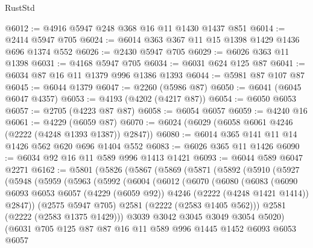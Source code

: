 \begin{lexlean}{RustStd}
\begin{coremodule}
@6012 := @4916 @5947 @248 @368 @16 @11 @1430 @1437 @851
@6014 := @2414 @5947 @705
@6024 := @6014 @363 @367 @11 @15 @1398 @1429 @1436 @696 @1374 @552
@6026 := @2430 @5947 @705
@6029 := @6026 @363 @11 @1398
@6031 := @4168 @5947 @705
@6034 := @6031 @624 @125 @87
@6041 := @6034 @87 @16 @11 @1379 @996 @1386 @1393
@6044 := @5981 @87 @107 @87
@6045 := @6044 @1379
@6047 := @2260 (@5986 @87)
@6050 := @6041 (@6045 @6047 @4357)
@6053 := @4193 (@4202 (@4217 @87))
@6054 := @6050 @6053
@6057 := @2705 (@4223 @87 @87)
@6058 := @6054 @6057
@6059 := @4240 @16
@6061 := @4229 (@6059 @87)
@6070 := @6024 (@6029 (@6058 @6061 @4246 (@2222 (@4248 @1393 @1387)) @2847))
@6080 := @6014 @365 @141 @11 @14 @1426 @562 @620 @696 @1404 @552
@6083 := @6026 @365 @11 @1426
@6090 := @6034 @92 @16 @11 @589 @996 @1413 @1421
@6093 := @6044 @589 @6047 @2271
@6162 := @5801
    (@5826
      (@5867
        (@5869
          (@5871
            (@5892
              (@5910
                (@5927
                  (@5948
                    (@5959
                      (@5963
                        (@5992
                          (@6004
                            (@6012
                              (@6070
                                (@6080
                                  (@6083
                                    (@6090
                                      @6093
                                      @6053
                                      @6057
                                      (@4229 (@6059 @92))
                                      @4246
                                      (@2222 (@4248 @1421 @1414))
                                      @2847))
                                  (@2575 @5947 @705)
                                  @2581
                                  (@2222 (@2583 @1405 @562)))
                                @2581
                                (@2222 (@2583 @1375 @1429)))
                              @3039
                              @3042
                              @3045
                              @3049
                              @3054
                              @5020)
                            (@6031
                              @705
                              @125
                              @87
                              @87
                              @16
                              @11
                              @589
                              @996
                              @1445
                              @1452
                              @6093
                              @6053
                              @6057

\end{coremodule}
\end{lexlean}
